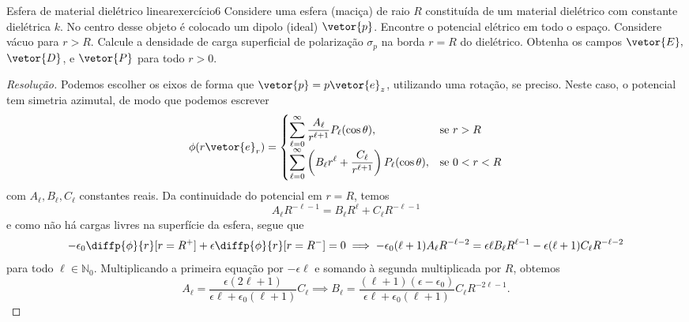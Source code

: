 \begin{exercício}{Esfera de material dielétrico linear}{exercício6}
    Considere uma esfera (maciça) de raio \(R\) constituída de um material dielétrico com constante dielétrica \(k\). No centro desse objeto é colocado um dipolo (ideal) \(\vetor{p}\). Encontre o potencial elétrico em todo o espaço. Considere vácuo para \(r > R\). Calcule a densidade de carga superficial de polarização \(\sigma_p\) na borda \(r = R\) do dielétrico. Obtenha os campos \(\vetor{E},\) \(\vetor{D}\), e \(\vetor{P}\) para todo \(r > 0\).
\end{exercício}
\begin{proof}[Resolução]
    Podemos escolher os eixos de forma que \(\vetor{p} = p \vetor{e}_z\), utilizando uma rotação, se preciso. Neste caso, o potencial tem simetria azimutal, de modo que podemos escrever
    \begin{equation*}
        \phi(r\vetor{e}_r) = \begin{cases}
            \displaystyle\sum_{\ell = 0}^\infty \frac{A_{\ell}}{r^{\ell + 1}} P_\ell(\cos\theta),&\text{se }r > R\\
            \displaystyle\sum_{\ell = 0}^\infty \left(B_\ell r^{\ell} + \frac{C_\ell}{r^{\ell + 1}}\right) P_\ell(\cos\theta),&\text{se }0 < r < R
        \end{cases}
    \end{equation*}
    com \(A_\ell, B_\ell, C_\ell\) constantes reais. Da continuidade do potencial em \(r = R\), temos
    \begin{equation*}
        A_\ell R^{-\ell - 1} = B_\ell R^\ell + C_\ell R^{-\ell - 1}
    \end{equation*}
    e como não há cargas livres na superfície da esfera, segue que
    \begin{equation*}
        -\epsilon_0 \diffp{\phi}{r}[r = R^+] + \epsilon \diffp{\phi}{r}[r = R^-] = 0 \implies -\epsilon_0 (\ell + 1)A_\ell R^{-\ell - 2} = \epsilon \ell B_\ell R^{\ell - 1} - \epsilon (\ell + 1) C_\ell R^{-\ell - 2}
    \end{equation*}
    para todo \(\ell \in \mathbb{N}_0\). Multiplicando a primeira equação por \(-\epsilon \ell\) e somando à segunda multiplicada por \(R\), obtemos
    \begin{equation*}
        A_\ell = \frac{\epsilon(2\ell + 1)}{\epsilon \ell + \epsilon_0 (\ell + 1)}C_\ell \implies B_\ell = \frac{(\ell + 1)(\epsilon - \epsilon_0)}{\epsilon \ell + \epsilon_0 (\ell + 1)} C_\ell R^{-2\ell -1}.
    \end{equation*}

\end{proof}

